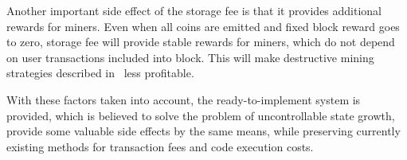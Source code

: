 \documentclass[]{llncs}   %
\begin{document}
Another important side effect of the storage fee is that it provides additional rewards 
for miners. Even when all coins are emitted and fixed block reward goes to zero,
storage fee will provide stable rewards for miners, which do not depend on user transactions included into block.
This will make destructive mining strategies described in~\cite{carlsten2016instability} less profitable.

With these factors taken into account, the ready-to-implement system is provided,
which is believed to solve the problem of uncontrollable state growth, provide some
valuable side effects by the same means, while preserving currently existing
methods for transaction fees and code execution costs.





\end{document}
